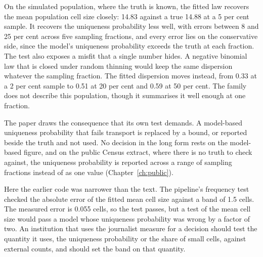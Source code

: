 On the simulated population, where the truth is known, the fitted law recovers the
mean population cell size closely: 14.83 against a true 14.88 at a 5 per cent
sample. %
It recovers the uniqueness probability less well, with errors between 8 and 25 per
cent across five sampling fractions, and every error lies on the conservative side,
since the model's uniqueness probability exceeds the truth at each fraction.
The test also exposes a misfit that a single number hides. A negative binomial law
that is closed under random thinning would keep the same dispersion whatever the
sampling fraction. The fitted dispersion moves instead, from 0.33 at a 2 per cent
sample to 0.51 at 20 per cent and 0.59 at 50 per cent.
The family does not describe this population, though it summarises it well enough
at one fraction.

The paper draws the consequence that its own test demands. A model-based
uniqueness probability that fails transport is replaced by a bound, or reported
beside the truth and not used. No decision in the long form rests on the
model-based figure, and on the public Census extract, where there is no truth to
check against, the uniqueness probability is reported across a range of sampling
fractions instead of as one value (Chapter~\ref{ch:public}).

Here the earlier code was narrower than the text. The pipeline's frequency test checked
the absolute error of the fitted mean cell size against a band of 1.5 cells.
The measured error is 0.055 cells, so the test passes, but a test of the mean cell
size would pass a model whose uniqueness probability was wrong by a factor of two.
An institution that uses the journalist measure for a decision should test the
quantity it uses, the uniqueness probability or the share of small cells, against
external counts, and should set the band on that quantity.

